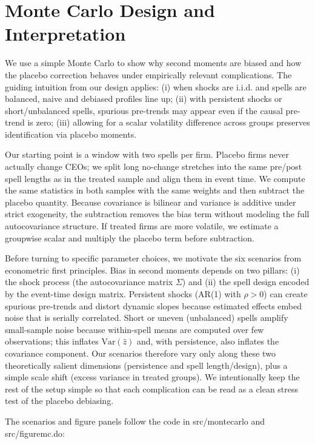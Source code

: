 \documentclass[11pt,a4paper]{article}
\newcommand{\Var}{\text{Var}}
\begin{document}
\section{Monte Carlo Design and Interpretation}

We use a simple Monte Carlo to show why second moments are biased and how the placebo correction behaves under empirically relevant complications. The guiding intuition from our design applies: (i) when shocks are i.i.d. and spells are balanced, naive and debiased profiles line up; (ii) with persistent shocks or short/unbalanced spells, spurious pre-trends may appear even if the causal pre-trend is zero; (iii) allowing for a scalar volatility difference across groups preserves identification via placebo moments.

Our starting point is a window with two spells per firm. Placebo firms never actually change CEOs; we split long no-change stretches into the same pre/post spell lengths as in the treated sample and align them in event time. We compute the same statistics in both samples with the same weights and then subtract the placebo quantity. Because covariance is bilinear and variance is additive under strict exogeneity, the subtraction removes the bias term without modeling the full autocovariance structure. If treated firms are more volatile, we estimate a groupwise scalar and multiply the placebo term before subtraction.

Before turning to specific parameter choices, we motivate the six scenarios from econometric first principles. Bias in second moments depends on two pillars: (i) the shock process (the autocovariance matrix \(\Sigma\)) and (ii) the spell design encoded by the event-time design matrix. Persistent shocks (AR(1) with \(\rho>0\)) can create spurious pre-trends and distort dynamic slopes because estimated effects embed noise that is serially correlated. Short or uneven (unbalanced) spells amplify small-sample noise because within-spell means are computed over few observations; this inflates \(\Var(\hat z)\) and, with persistence, also inflates the covariance component. Our scenarios therefore vary only along these two theoretically salient dimensions (persistence and spell length/design), plus a simple scale shift (excess variance in treated groups). We intentionally keep the rest of the setup simple so that each complication can be read as a clean stress test of the placebo debiasing.

The scenarios and figure panels follow the code in src/montecarlo and src/figuremc.do:
\end{document}
